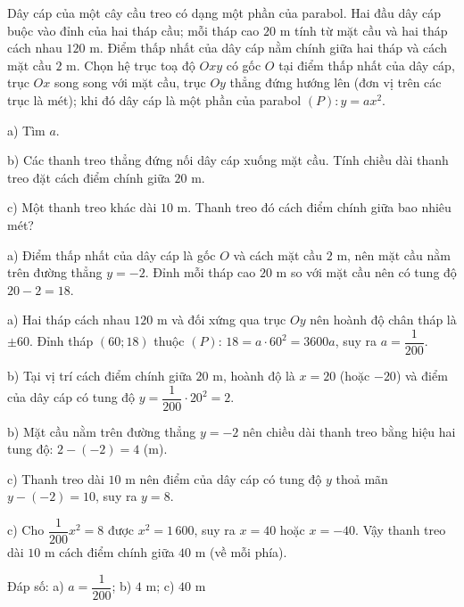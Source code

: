 \begin{problem}[9DS-HSB2-048]
Dây cáp của một cây cầu treo có dạng một phần của parabol. Hai đầu dây cáp buộc vào đỉnh của hai tháp cầu; mỗi tháp cao $20$ m tính từ mặt cầu và hai tháp cách nhau $120$ m. Điểm thấp nhất của dây cáp nằm chính giữa hai tháp và cách mặt cầu $2$ m. Chọn hệ trục toạ độ $Oxy$ có gốc $O$ tại điểm thấp nhất của dây cáp, trục $Ox$ song song với mặt cầu, trục $Oy$ thẳng đứng hướng lên (đơn vị trên các trục là mét); khi đó dây cáp là một phần của parabol $(P)\colon y = ax^2$.

a) Tìm $a$.

b) Các thanh treo thẳng đứng nối dây cáp xuống mặt cầu. Tính chiều dài thanh treo đặt cách điểm chính giữa $20$ m.

c) Một thanh treo khác dài $10$ m. Thanh treo đó cách điểm chính giữa bao nhiêu mét?

\begin{solution}
a) Điểm thấp nhất của dây cáp là gốc $O$ và cách mặt cầu $2$ m, nên mặt cầu nằm trên đường thẳng $y = -2$. Đỉnh mỗi tháp cao $20$ m so với mặt cầu nên có tung độ $20 - 2 = 18$.

a) Hai tháp cách nhau $120$ m và đối xứng qua trục $Oy$ nên hoành độ chân tháp là $\pm 60$. Đỉnh tháp $(60; 18)$ thuộc $(P)$: $18 = a \cdot 60^2 = 3600a$, suy ra $a = \dfrac{1}{200}$.

b) Tại vị trí cách điểm chính giữa $20$ m, hoành độ là $x = 20$ (hoặc $-20$) và điểm của dây cáp có tung độ $y = \dfrac{1}{200} \cdot 20^2 = 2$.

b) Mặt cầu nằm trên đường thẳng $y = -2$ nên chiều dài thanh treo bằng hiệu hai tung độ: $2 - (-2) = 4$ (m).

c) Thanh treo dài $10$ m nên điểm của dây cáp có tung độ $y$ thoả mãn $y - (-2) = 10$, suy ra $y = 8$.

c) Cho $\dfrac{1}{200}x^2 = 8$ được $x^2 = 1\,600$, suy ra $x = 40$ hoặc $x = -40$. Vậy thanh treo dài $10$ m cách điểm chính giữa $40$ m (về mỗi phía).

Đáp số: a) $\boxed{a = \dfrac{1}{200}}$; b) $\boxed{4 \text{ m}}$; c) $\boxed{40 \text{ m}}$
\end{solution}
\end{problem}

